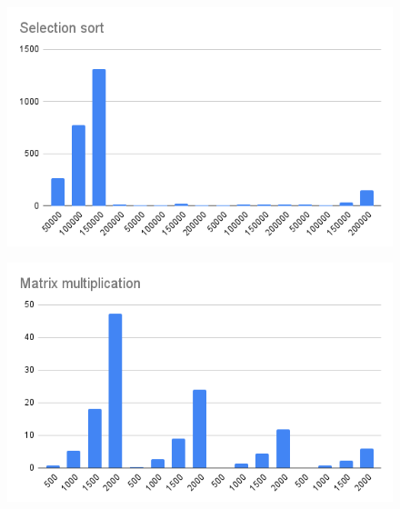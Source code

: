 \begin{minipage}{0.5\textwidth}
    \begin{figure}[H]
        \centering
        \includegraphics[width=1.0\textwidth]{graphics/Selection_sort.png}
        \label{fig:Bubble_Sort}
    \end{figure}
\end{minipage}
\begin{minipage}{0.5\textwidth}
    \begin{figure}[H]
        \centering
        \includegraphics[width=1.0\textwidth]{graphics/Matrix_multiplication.png}
    \end{figure}
\end{minipage}

